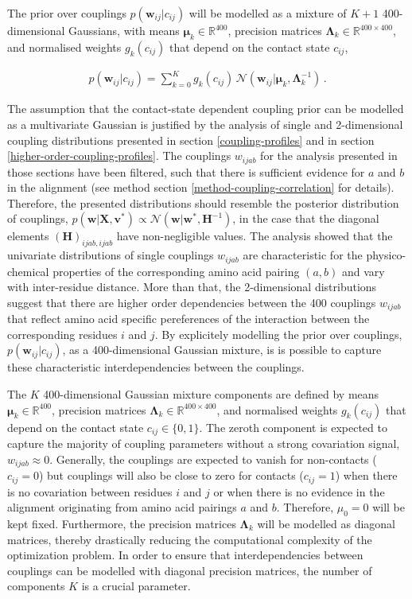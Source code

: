 \documentclass[11pt,a4paper,twoside]{book}
\newcommand{\eq}{\!=\!}
\newcommand{\Gauss}{\mathcal{N}}
\renewcommand{\H}{\mathbf{H}}
\newcommand{\Lk}{\mathbf{\Lambda}_k}
\newcommand{\muk}{\mathbf{\mu}_k}
\newcommand{\cij}{c_{ij}}
\renewcommand{\v}{\mathbf{v}}
\newcommand{\w}{\mathbf{w}}
\newcommand{\wij}{\mathbf{w}_{ij}}
\newcommand{\wijab}{w_{ijab}}
\newcommand{\X}{\mathbf{X}}
\theoremstyle{definition}
\theoremstyle{definition}
\theoremstyle{remark}
\begin{document}
The prior over couplings \(p(\wij|\cij)\) will be modelled as a mixture
of \(K\!+\!1\) 400-dimensional Gaussians, with means
\(\muk \in \mathbb{R}^{400}\), precision matrices
\(\Lk \in \mathbb{R}^{400\times 400}\), and normalised weights
\(g_k(\cij)\) that depend on the contact state \(\cij\),

\begin{align}   
      p(\wij | \cij) = \sum_{k=0}^K g_k(\cij) \, \Gauss(\wij | \muk, \Lk^{-1}) \,.
\label{eq:definition-mixture-coupling-prior}
\end{align}

The assumption that the contact-state dependent coupling prior can be
modelled as a multivariate Gaussian is justified by the analysis of
single and 2-dimensional coupling distributions presented in section
\ref{coupling-profiles} and in section
\ref{higher-order-coupling-profiles}. The couplings \(\wijab\) for the
analysis presented in those sections have been filtered, such that there
is sufficient evidence for \(a\) and \(b\) in the alignment (see method
section \ref{method-coupling-correlation} for details). Therefore, the
presented distributions should resemble the posterior distribution of
couplings, \(p(\w | \X , \v^*) \propto \Gauss (\w | \w^*, \H^{-1})\), in
the case that the diagonal elements \((\H)_{ijab, ijab}\) have
non-negligible values. The analysis showed that the univariate
distributions of single couplings \(\wijab\) are characteristic for the
physico-chemical properties of the corresponding amino acid pairing
\((a,b)\) and vary with inter-residue distance. More than that, the
2-dimensional distributions suggest that there are higher order
dependencies between the 400 couplings \(\wijab\) that reflect amino
acid specific pereferences of the interaction between the corresponding
residues \(i\) and \(j\). By explicitely modelling the prior over
couplings, \(p(\wij|\cij)\), as a 400-dimensional Gaussian mixture, is
is possible to capture these characteristic interdependencies between
the couplings.

The \(K\) 400-dimensional Gaussian mixture components are defined by
means \(\muk \in \mathbb{R}^{400}\), precision matrices
\(\Lk \in \mathbb{R}^{400\times 400}\), and normalised weights
\(g_k(\cij)\) that depend on the contact state
\(\cij \! \in \! \{0,1\}\). The zeroth component is expected to capture
the majority of coupling parameters without a strong covariation signal,
\(\wijab \! \approx \! 0\). Generally, the couplings are expected to
vanish for non-contacts (\(\cij \eq 0\)) but couplings will also be
close to zero for contacts (\(\cij \eq 1\)) when there is no covariation
between residues \(i\) and \(j\) or when there is no evidence in the
alignment originating from amino acid pairings \(a\) and \(b\).
Therefore, \(\mu_{0} \eq 0\) will be kept fixed. Furthermore, the
precision matrices \(\Lk\) will be modelled as diagonal matrices,
thereby drastically reducing the computational complexity of the
optimization problem. In order to ensure that interdependencies between
couplings can be modelled with diagonal precision matrices, the number
of components \(K\) is a crucial parameter.
\end{document}
